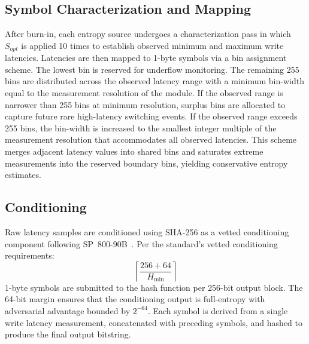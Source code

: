 \subsection{Symbol Characterization and Mapping}
After burn-in, each entropy source undergoes a characterization pass in
which $S_{opt}$ is applied 10 times to establish observed minimum and
maximum write latencies. Latencies are then mapped to 1-byte symbols via
a bin assignment scheme. The lowest bin is reserved for underflow
monitoring. The remaining 255 bins are distributed across the observed
latency range with a minimum bin-width equal to the measurement
resolution of the module. If the observed range is narrower than 255
bins at minimum resolution, surplus bins are allocated to capture future
rare high-latency switching events. If the observed range exceeds 255
bins, the bin-width is increased to the smallest integer multiple of the
measurement resolution that accommodates all observed latencies. This
scheme merges adjacent latency values into shared bins and saturates
extreme measurements into the reserved boundary bins, yielding
conservative entropy estimates.

\subsection{Conditioning}
Raw latency samples are conditioned using SHA-256 as a vetted
conditioning component following
SP~800-90B~\cite{sonmez2016recommendation}. Per the standard's vetted
conditioning requirements:
\begin{equation}
	\left\lceil\frac{256 + 64}{H_{\min}}\right\rceil
\end{equation}
1-byte symbols are submitted to the hash
function per 256-bit output block. The 64-bit margin ensures that the
conditioning output is full-entropy with adversarial advantage bounded
by $2^{-64}$. Each symbol is derived from a single write latency
measurement, concatenated with preceding symbols, and hashed to produce
the final output bitstring.
